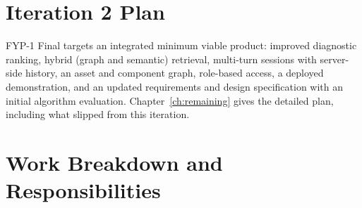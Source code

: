 \section{Iteration 2 Plan}
FYP-1 Final targets an integrated minimum viable product: improved diagnostic ranking, hybrid (graph and semantic) retrieval, multi-turn sessions with server-side history, an asset and component graph, role-based access, a deployed demonstration, and an updated requirements and design specification with an initial algorithm evaluation. Chapter~\ref{ch:remaining} gives the detailed plan, including what slipped from this iteration.

\section{Work Breakdown and Responsibilities}
